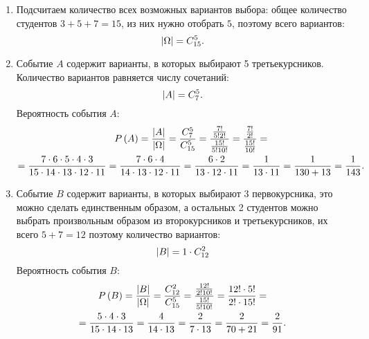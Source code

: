 \begin{enumerate}
    \item
    Подсчитаем количество всех возможных вариантов выбора: общее количество студентов $3+5+7=15$, из них нужно отобрать $5$, поэтому всего вариантов:
    \begin{equation}
        \left | \Omega \right | = C_{15}^5 .
    \end{equation}

    \item
    Событие $A$ содержит варианты, в которых выбирают 5 третьекурсников. Количество вариантов равняется числу сочетаний:
    \begin{equation}
        \left | A \right | = C_7^5 .
    \end{equation}
    Вероятность события $A$:
    \begin{multline}
        P \left ( A \right )
        = \frac{\left | A \right |}{\left | \Omega \right |}
        = \frac{C_7^5}{C_{15}^5}
        = \frac{\frac{7!}{5!2!}}{\frac{15!}{5!10!}}
        = \frac{\frac{7!}{2!}}{\frac{15!}{10!}} = \\
        = \frac{7 \cdot 6 \cdot 5 \cdot 4 \cdot 3}{15 \cdot 14 \cdot 13 \cdot 12 \cdot 11}
        = \frac{7 \cdot 6 \cdot 4}{14 \cdot 13 \cdot 12 \cdot 11}
        = \frac{6 \cdot 2}{13 \cdot 12 \cdot 11}
        = \frac{1}{13 \cdot 11}
        = \frac{1}{130 + 13}
        = \frac{1}{143} .
    \end{multline}

    \item
    Событие $B$ содержит варианты, в которых выбирают 3 первокурсника, это можно сделать единственным образом, а остальных 2 студентов можно выбрать произвольным образом
    из второкурсников и третьекурсников, их всего $5+7 = 12$ поэтому количество вариантов:
    \begin{equation}
        \left | B \right | = 1 \cdot C_{12}^2
    \end{equation}
    Вероятность события $B$:
    \begin{multline}
        P \left ( B \right )
        = \frac{\left | B \right |}{\left | \Omega \right |}
        = \frac{C_{12}^2}{C_{15}^5}
        = \frac{\frac{12!}{2!10!}}{\frac{15!}{5!10!}}
        = \frac{12! \cdot 5!}{2! \cdot 15!} = \\
        = \frac{5 \cdot 4 \cdot 3}{15 \cdot 14 \cdot 13}
        = \frac{4}{14 \cdot 13}
        = \frac{2}{7 \cdot 13}
        = \frac{2}{70 + 21}
        = \frac{2}{91} .
    \end{multline}


\end{enumerate}
